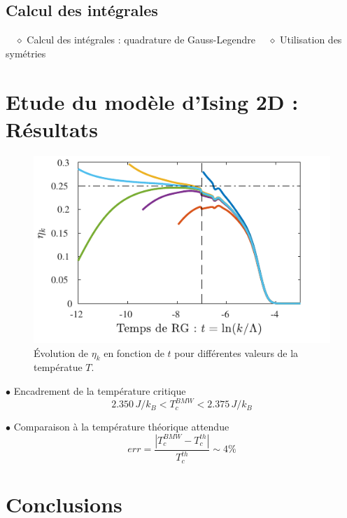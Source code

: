\documentclass[9pt]{beamer}
\begin{document}
	\subsection{Calcul des intégrales}
		\begin{frame}
	\justifying
	\vspace*{22pt}
	
	$\quad \diamond$ Calcul des intégrales : quadrature de Gauss-Legendre
	$\quad \diamond$ Utilisation des symétries
		\end{frame}
		
		\section{Etude du modèle d'Ising 2D : Résultats}
		\sommaire{}
		\begin{frame}
	\justifying
	\vspace*{22pt}
	
	\begin{figure}[H]
\begin{center}
	\includegraphics[scale=0.7]{MesuRes.pdf}
\end{center}
\caption{Évolution de $\eta_k$ en fonction de $t$ pour différentes valeurs de la températue $T$.}
\label{fig:etaMesu}
\end{figure}

$\bullet$ Encadrement de la température critique
\begin{equation}
2.350 \, J/k_B < T_c^{BMW}  < 2.375 \, J/k_B
\end{equation}

$\bullet $ Comparaison à la température théorique attendue
\begin{equation}
	err = \frac{ |T_c^{BMW} - T_c^{th}|}{T_c^{th}} \sim 4 \%
\end{equation}



	
	\end{frame}
	
	
	\section{Conclusions}
		\begin{frame}
	\justifying
	\vspace*{22pt}
	
	\end{frame}
	
	
\end{document}
